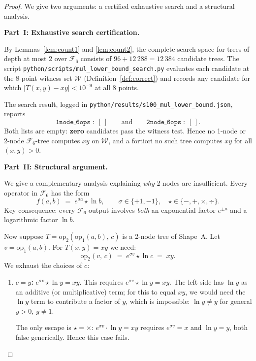 \documentclass[12pt,a4paper]{article}
\theoremstyle{definition}
\begin{document}
\begin{proof}
We give two arguments: a certified exhaustive search and a structural analysis.

\smallskip
\noindent\textbf{Part~I: Exhaustive search certification.}

By Lemmas~\ref{lem:count1} and \ref{lem:count2}, the complete search space
for trees of depth at most 2 over $\mathcal{F}_6$ consists of
$96 + 12\,288 = 12\,384$ candidate trees.  The script
\texttt{python/scripts/mul\_lower\_bound\_search.py} evaluates each
candidate at the 8-point witness set $\mathcal{W}$ (Definition~\ref{def:correct})
and records any candidate for which $|T(x,y)-xy|<10^{-9}$ at all 8 points.

The search result, logged in \texttt{python/results/s100\_mul\_lower\_bound.json},
reports
\[
  \texttt{1node\_6ops}\;:\;[\,] \qquad\text{and}\qquad
  \texttt{2node\_6ops}\;:\;[\,].
\]
Both lists are empty: \textbf{zero} candidates pass the witness test.
Hence no 1-node or 2-node $\mathcal{F}_6$-tree computes $xy$ on $\mathcal{W}$,
and a fortiori no such tree computes $xy$ for all $(x,y)>0$.

\smallskip
\noindent\textbf{Part~II: Structural argument.}

We give a complementary analysis explaining \emph{why} 2 nodes are
insufficient.  Every operator in $\mathcal{F}_6$ has the form
\begin{equation}\label{eq:F6form}
  f(a,b) \;=\; e^{\sigma a} \star \ln b,
  \qquad \sigma\in\{+1,-1\},\quad
  \star\in\{-,+,\times,\div\}.
\end{equation}
Key consequence: every $\mathcal{F}_6$ output involves \emph{both} an
exponential factor $e^{\pm a}$ and a logarithmic factor $\ln b$.

Now suppose $T = \mathrm{op}_2(\mathrm{op}_1(a,b),\,c)$ is a 2-node tree
of Shape~A.  Let $v = \mathrm{op}_1(a,b)$.  For $T(x,y) = xy$ we need:
\[
  \mathrm{op}_2(v,\,c) \;=\; e^{\sigma v}\star\ln c \;=\; xy.
\]
We exhaust the choices of $c$:

\begin{enumerate}
\item \textbf{$c = y$:}
      $e^{\sigma v}\star\ln y = xy$.
      This requires $e^{\sigma v}\star \ln y = xy$.  The left side has $\ln y$
      as an additive (or multiplicative) term; for this to equal $xy$, we would
      need the $\ln y$ term to contribute a factor of $y$, which is impossible:
      $\ln y \neq y$ for general $y>0$, $y\neq 1$.

      The only escape is $\star=\times$: $e^{\sigma v}\cdot\ln y = xy$ requires
      $e^{\sigma v}=x$ and $\ln y = y$, both false generically.  Hence this case
      fails.


\end{enumerate}
\end{proof}
\end{document}
